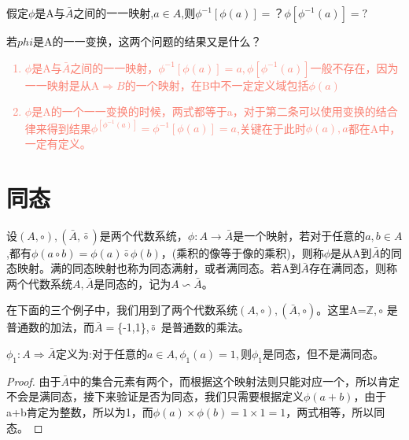 \documentclass[
	11pt, %
	fleqn, %
	a4paper, %
]{LegrandOrangeBook}
\begin{document}
\begin{example}
	假定$\phi$是A与$\bar{A}$之间的一一映射,$a\in A$,则$\phi^{-1}[\phi(a)]=？ \phi[\phi^{-1}(a)]=?$

	若$phi$是A的一一变换，这两个问题的结果又是什么？

	\textcolor{Salmon}{
		\begin{enumerate}
			\item $\phi$是A与$\bar{A}$之间的一一映射，$\phi^{-1}[\phi(a)]=a,\phi[\phi^{-1}(a)]$一般不存在，因为一一映射是从A$\Rightarrow B$的一个映射，在B中不一定定义域包括$\phi(a)$
			\item $\phi$是A的一个一一变换的时候，两式都等于a，对于第二条可以使用变换的结合律来得到结果$\phi^[\phi^{-1}(a)]=\phi^{-1}[\phi(a)]=a$,关键在于此时$\phi(a),a$都在A中，一定有定义。
		\end{enumerate}
	}
\end{example}

\section{同态}
\begin{definition}
	设$(A,\circ),(\bar{A},\bar{\circ})$是两个代数系统，$\phi:A\rightarrow \bar{A}$是一个映射，若对于任意的$a,b\in A$,都有$\phi(a\circ b)=\phi(a)\bar{\circ}\phi(b)$，(乘积的像等于像的乘积)，则称$\phi$是从A到$\bar{A}$的同态映射。满的同态映射也称为同态满射，或者满同态。若A到$\bar{A}$存在满同态，则称两个代数系统$A,\bar{A}$是同态的，记为$A\backsim\bar{A}$。
\end{definition}

\begin{remark}
	在下面的三个例子中，我们用到了两个代数系统$(A,\circ),(\bar{A},\circ)$。这里A=$\mathbb{Z},\circ$ 是普通数的加法，而$\bar{A}=$\{-1,1\},$\bar{\circ}$ 是普通数的乘法。

\end{remark}


\begin{example}
	$\phi_1:A\Rightarrow\bar{A}$定义为:对于任意的$a\in A,\phi_1(a)=1,$则$\phi_1$是同态，但不是满同态。
\end{example}
\begin{proof}
	\textcolor[HTML]{e74c3c}{由于$\bar{A}$中的集合元素有两个，而根据这个映射法则只能对应一个，所以肯定不会是满同态，接下来验证是否为同态，我们只需要根据定义$\phi(a+b)$，由于a+b肯定为整数，所以为1，而$\phi(a)\times \phi(b)=1\times 1=1$，两式相等，所以同态。}
\end{proof}
\end{document}
